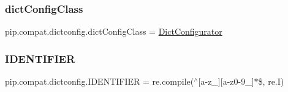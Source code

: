 \subsubsection{\texorpdfstring{dict\+Config\+Class}{dictConfigClass}}
{\footnotesize\ttfamily pip.\+compat.\+dictconfig.\+dict\+Config\+Class = \hyperlink{classpip_1_1compat_1_1dictconfig_1_1_dict_configurator}{Dict\+Configurator}}

\mbox{\label{namespacepip_1_1compat_1_1dictconfig_a62131f0da612d375b64aa1fc74538872}} 
\subsubsection{\texorpdfstring{I\+D\+E\+N\+T\+I\+F\+I\+ER}{IDENTIFIER}}
{\footnotesize\ttfamily pip.\+compat.\+dictconfig.\+I\+D\+E\+N\+T\+I\+F\+I\+ER = re.\+compile(\textquotesingle{}$^\wedge$\mbox{[}a-\/z\+\_\+\mbox{]}\mbox{[}a-\/z0-\/9\+\_\+\mbox{]}$\ast$\$\textquotesingle{}, re.\+I)}

